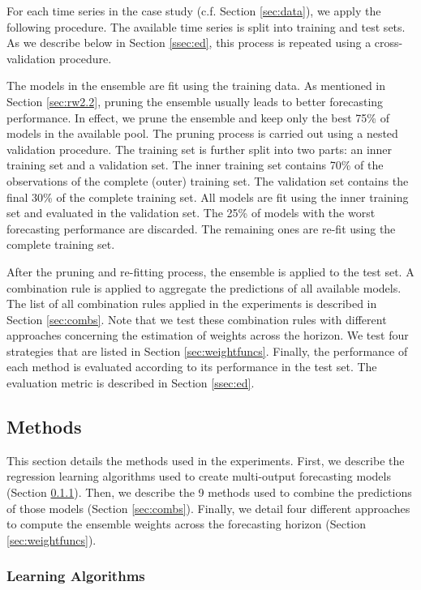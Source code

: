 \documentclass[smallcondensed]{svjour3}
\begin{document}
For each time series in the case study (c.f. Section \ref{sec:data}), we apply the following procedure. The available time series is split into training and test sets. As we describe below in Section \ref{ssec:ed}, this process is repeated using a cross-validation procedure.

The models in the ensemble are fit using the training data. As mentioned in Section \ref{sec:rw2.2}, pruning the ensemble usually leads to better forecasting performance. In effect, we prune the ensemble and keep only the best 75\% of models in the available pool. The pruning process is carried out using a nested validation procedure. The training set is further split into two parts: an inner training set and a validation set. The inner training set contains 70\% of the observations of the complete (outer) training set. The validation set contains the final 30\% of the complete training set. All models are fit using the inner training set and evaluated in the validation set. The 25\% of models with the worst forecasting performance are discarded. The remaining ones are re-fit using the complete training set.

After the pruning and re-fitting process, the ensemble is applied to the test set. A combination rule is applied to aggregate the predictions of all available models. The list of all combination rules applied in the experiments is described in Section \ref{sec:combs}. Note that we test these combination rules with different approaches concerning the estimation of weights across the horizon. We test four strategies that are listed in Section \ref{sec:weightfuncs}. Finally, the performance of each method is evaluated according to its performance in the test set. The evaluation metric is described in Section \ref{ssec:ed}.

\subsection{Methods}\label{sec:actmethods}

This section details the methods used in the experiments. First, we describe the regression learning algorithms used to create multi-output forecasting models (Section \ref{sec:algos}). Then, we describe the 9 methods used to combine the predictions of those models (Section \ref{sec:combs}). Finally, we detail four different approaches to compute the ensemble weights across the forecasting horizon (Section \ref{sec:weightfuncs}).

\subsubsection{Learning Algorithms}\label{sec:algos}
\end{document}
